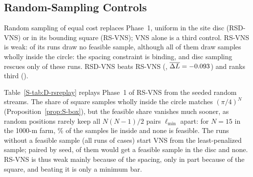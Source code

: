 \subsection{Random-Sampling Controls}
\label{sec:abl-controls}
Random sampling of equal cost replaces Phase~1, uniform in the site disc (RSD-VNS) or in its bounding square (RS-VNS); VNS alone is a third control. RS-VNS is weak: \NRSRunsNoFeasSample{} of its runs draw no feasible sample, although all of them draw samples wholly inside the circle: the spacing constraint is binding, and disc sampling rescues only \NRsSquareExplains{} of these runs. RSD-VNS beats RS-VNS (\NAblRSDVNSvsRSVNS, $\overline{\Delta L}=-0.093$) and ranks third (\NRankRSDVNS).

Table~\ref{S-tab:D-rsreplay} replays Phase~1 of RS-VNS from the seeded random streams. The share of square samples wholly inside the circle matches $(\pi/4)^N$ (Proposition~\ref{prop:S-box}), but the feasible share vanishes much sooner, as random positions rarely keep all $N(N-1)/2$ pairs $\ell_{\min}$ apart: for $N=15$ in the 1000-m farm, \NDRsInsideNFifteen\% of the \NDRsSamples{} samples lie inside and none is feasible. The \NRSRunsNoFeasSample{} runs without a feasible sample (all runs of \NDRsCasesNoFeasSample{} cases) start VNS from the least-penalized sample; paired by seed, \NRsSquareExplains{} of them would get a feasible sample in the disc and \NRsSpacingDominates{} none. RS-VNS is thus weak mainly because of the spacing, only in part because of the square, and beating it is only a minimum bar.

